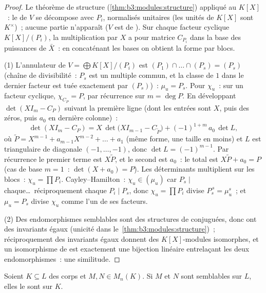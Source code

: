 \begin{proof}
Le théorème de structure (\cref{thm:b3:modules:structure})
appliqué au  $K[X]$~: le  de  $V$ se décompose
avec  $P_i$, normalisés unitaires (les unités
de $K[X]$ sont $K^\times$)~; aucune partie  n'apparaît ($V$
est de ). Sur chaque facteur cyclique $K[X]/(P_i)$, la
multiplication par $X$ a pour matrice $C_{P_i}$ dans la base des
puissances de $\bar X$~: en concaténant les bases on obtient la
forme par blocs.

(1) L'annulateur de $V = \bigoplus K[X]/(P_i)$ est $(P_1)\cap
\dots\cap(P_s) = (P_s)$ (chaîne de divisibilité~: $P_s$ est un
multiple commun, et la classe de $1$ dans le dernier facteur est
tuée exactement par $(P_s)$)~: $\mu_u = P_s$. Pour $\chi_u$~: sur
un facteur cyclique, $\chi_{C_P} = P$, par récurrence sur $m =
\deg P$. En développant $\det(XI_m - C_P)$ suivant la première
ligne (dont les entrées sont $X$, puis des zéros, puis $a_0$ en
dernière colonne)~:
\[
\det(XI_m - C_P) = X\,\det\bigl(XI_{m-1} - C_{\tilde P}\bigr)
+ (-1)^{1+m}\,a_0\,\det L ,
\]
où $\tilde P = X^{m-1} + a_{m-1}X^{m-2} + \dots + a_1$ (même
forme, une taille en moins) et $L$ est triangulaire de diagonale
$(-1, \dots, -1)$, donc $\det L = (-1)^{m-1}$. Par récurrence le
premier terme est $X\tilde P$, et le second est $a_0$~: le total
est $X\tilde P + a_0 = P$ (cas de base $m=1$~: $\det(X + a_0) =
P$). Les déterminants multiplient sur les blocs~: $\chi_u =
\prod P_i$. Cayley--Hamilton~: $\chi_u \in (\mu_u)$ car $P_s
\mid$ chaque\dots\ réciproquement chaque $P_i \mid P_s$, donc
$\chi_u = \prod P_i$ divise $P_s^{\,s} = \mu_u^s$~; et $\mu_u =
P_s$ divise $\chi_u$ comme l'un de ses facteurs.

(2) Des endomorphismes semblables sont des structures de 
conjuguées, donc ont des invariants égaux (unicité dans
le~\cref{thm:b3:modules:structure})~; réciproquement des
invariants égaux donnent des $K[X]$-modules isomorphes, et un
isomorphisme de  est exactement une bijection linéaire
entrelaçant les deux endomorphismes~: une similitude.
\end{proof}

\begin{corollary}\label{cor:b3:modules:descent}
Soient $K \subseteq L$ des corps et $M, N \in M_n(K)$. Si $M$ et
$N$ sont semblables sur $L$, elles le sont sur $K$.
\end{corollary}

